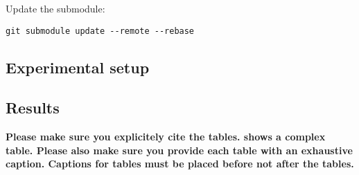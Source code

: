 Update the submodule:

\begin{verbatim}
git submodule update --remote --rebase
\end{verbatim}

\lipsum[1]
\subsection{Experimental setup}
\lipsum[1-2]
\subsection{Results}
\textbf{Please make sure you explicitely cite the tables.
 shows a complex table.
Please also make sure you provide each table with an exhaustive caption.
Captions for tables must be placed before not after the tables.}
\lipsum[1-4]


